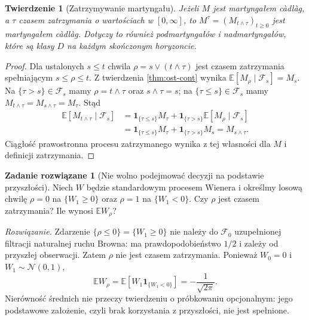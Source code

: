 \documentclass[11pt,a4paper,oneside]{report}
\numberwithin{equation}{chapter}
\theoremstyle{plain}
\newtheorem{twierdzenie}{Twierdzenie}[chapter]
\theoremstyle{definition}
\newtheorem{zadanie}{Zadanie rozwiązane}[chapter]
\theoremstyle{remark}
\newcommand{\E}{\mathbb{E}}
\newcommand{\calF}{\mathcal{F}}
\newcommand{\ind}[1]{\mathbf{1}_{#1}}
\newcommand{\Normal}{\mathcal{N}}
\begin{document}
\begin{twierdzenie}[Zatrzymywanie martyngału]
Jeżeli $M$ jest martyngałem c\`adl\`ag, a $\tau$
czasem zatrzymania o wartościach w $[0,\infty]$,
to $M^\tau=(M_{t\wedge\tau})_{t\ge0}$ jest
martyngałem c\`adl\`ag. Dotyczy to również podmartyngałów i nadmartyngałów,
które są klasy $D$ na każdym skończonym horyzoncie.
\end{twierdzenie}
\begin{proof}
Dla ustalonych $s\le t$ chwila
$\rho=s\vee(t\wedge\tau)$ jest czasem zatrzymania
spełniającym $s\le\rho\le t$. Z twierdzenia
\ref{thm:ost-cont} wynika
$\E[M_\rho\mid\calF_s]=M_s$.
Na $\{\tau>s\}\in\calF_s$ mamy
$\rho=t\wedge\tau$ oraz $s\wedge\tau=s$;
na $\{\tau\le s\}\in\calF_s$ mamy
$M_{t\wedge\tau}=M_{s\wedge\tau}=M_\tau$.
Stąd
\[
\begin{aligned}
\E[M_{t\wedge\tau}\mid\calF_s]
&=\ind{\{\tau\le s\}}M_\tau+
\ind{\{\tau>s\}}\E[M_\rho\mid\calF_s]\\
&=\ind{\{\tau\le s\}}M_\tau+
\ind{\{\tau>s\}}M_s=M_{s\wedge\tau}.
\end{aligned}
\]
Ciągłość prawostronna procesu zatrzymanego wynika
z tej własności dla $M$ i definicji zatrzymania.
\end{proof}


\begin{zadanie}[Nie wolno podejmować decyzji na podstawie przyszłości]
Niech $W$ będzie standardowym procesem Wienera i określmy
losową chwilę $\rho=0$ na $\{W_1\ge0\}$ oraz $\rho=1$
na $\{W_1<0\}$. Czy $\rho$ jest czasem zatrzymania?
Ile wynosi $\E W_\rho$?

\emph{Rozwiązanie.} Zdarzenie $\{\rho\le0\}=\{W_1\ge0\}$
nie należy do $\calF_0$ uzupełnionej filtracji naturalnej
ruchu Browna: ma prawdopodobieństwo $1/2$ i zależy od przyszłej
obserwacji. Zatem $\rho$ nie jest czasem zatrzymania.
Ponieważ $W_0=0$ i $W_1\sim\Normal(0,1)$,
\[
\E W_\rho=\E[W_1\ind{\{W_1<0\}}]
=-\frac1{\sqrt{2\pi}}.
\]
Nierówność średnich nie przeczy twierdzeniu o próbkowaniu
opcjonalnym: jego podstawowe założenie, czyli brak
korzystania z przyszłości, nie jest spełnione.
\end{zadanie}
\end{document}
